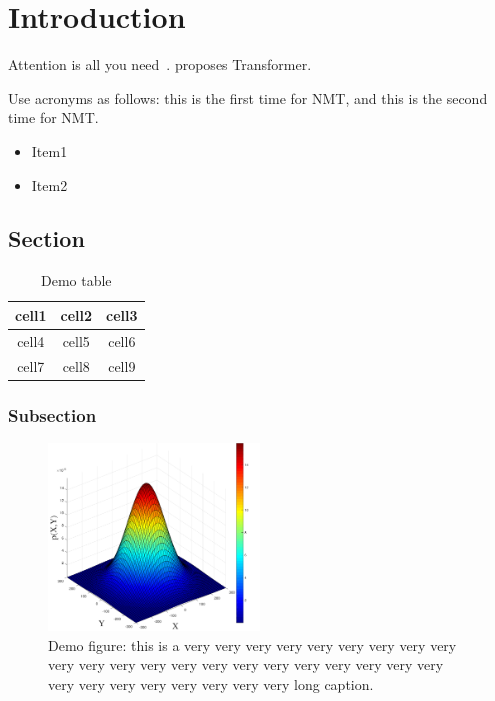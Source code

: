 
\chapter{Introduction}

Attention is all you need~\citep{vaswani2017attention}.
\citet{vaswani2017attention} proposes Transformer.

Use acronyms as follows: this is the first time for \ac{NMT}, and this is the
second time for \ac{NMT}.

\begin{itemize}
    \item Item1
    \item Item2
\end{itemize}

\lipsum[1-2]

\section{Section}

\lipsum[1-2]

\begin{table}[htb]
    \centering
    \caption{Demo table}
    \begin{tabular}{c|c|c}
        cell1 & cell2 & cell3 \\ 
        \hline
        cell4 & cell5 & cell6 \\ 
        cell7 & cell8 & cell9
    \end{tabular}
\end{table}

\subsection{Subsection}

\lipsum[1-2]

\begin{figure}[htb]
    \centering
    \includegraphics[width=0.5\textwidth]{fig/demo}
    \caption[
    Demo figure: short version
    ]{
        Demo figure: this is a very very very very very very very very very
        very very very very very very very very very very very very very very
        very very very very very very very long caption.
    }
\end{figure}
